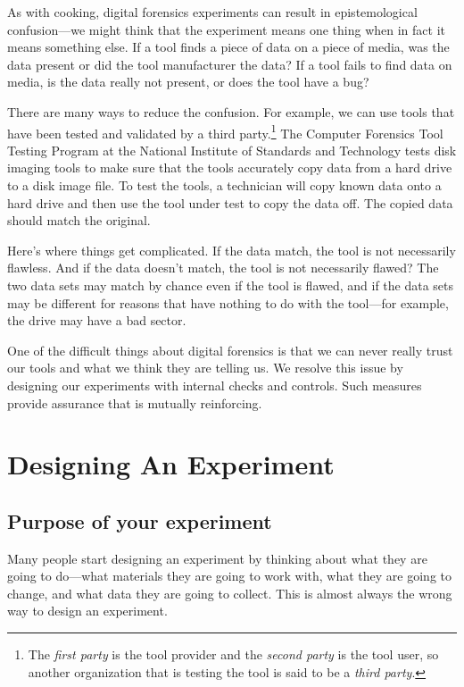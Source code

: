 As with cooking, digital forensics experiments can result in epistemological
confusion---we might think that the experiment means one thing when in
fact it means something else. If a tool finds a piece of data on a piece of media, was
the data present or did the tool manufacturer the data? If a tool
fails to find data on media, is the data really not present, or does
the tool have a bug?

There are many ways to reduce the confusion. For example, we can use
tools that have been
tested and validated by a third party.\footnote{The \emph{first party}
  is the tool provider and the \emph{second party} is the tool user,
  so another organization that is testing the tool is said to be a
  \emph{third party}.} The Computer Forensics Tool
Testing Program at the National Institute of
Standards and Technology tests disk imaging tools to make sure that
the tools accurately copy data from a hard drive to a disk image
file. To test the tools, a technician will copy known data onto a hard
drive and then use the tool under test to copy the data off. The copied data
should match the original.

Here's where things get complicated. If the data match, the tool is
not necessarily flawless. And if the data doesn't match, the tool
is not necessarily flawed? The two data sets may match by chance even
if the tool is flawed, and if the data sets may be different for
reasons that have nothing to do with the tool---for example, the drive
may have a bad sector. 

One of the difficult things about digital forensics is that we
can never really trust our tools and what we think they are telling
us. We resolve this issue by designing our experiments with internal
checks and controls. Such measures provide assurance that is mutually reinforcing.

\section{Designing An Experiment}


\subsection{Purpose of your experiment}

Many people start designing an experiment by thinking about what they
are going to do---what materials they are going to work with, what they are going to
change, and what data they are going to collect. This is almost always
the wrong way to design an experiment.


